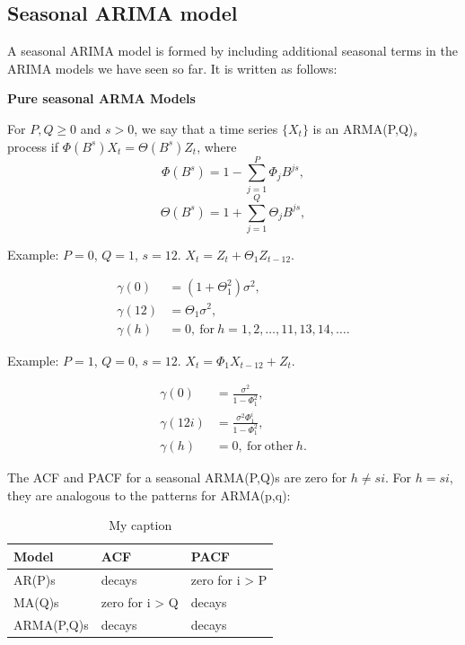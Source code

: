 \documentclass[]{book}
\begin{document}
\subsection{Seasonal ARIMA model}\label{seasonal-arima-model}

A seasonal ARIMA model is formed by including additional seasonal terms
in the ARIMA models we have seen so far. It is written as follows:

\textbf{Pure seasonal ARMA Models}

For \(P,Q \geq 0\) and \(s > 0\), we say that a time series \(\{X_t\}\)
is an ARMA(P,Q)\(_s\) process if \(\Phi(B^s)X_t = \Theta(B^s)Z_t\),
where \[
\Phi(B^s) = 1 - \sum_{j=1}^{P}\Phi_jB^{js},
\] \[
\Theta(B^s) = 1+ \sum_{j=1}^{Q}\Theta_jB^{js},
\]

Example: \(P=0\), \(Q=1\), \(s=12\). \(X_t=Z_t+\Theta_1Z_{t-12}\).

\begin{align*}
\gamma(0) &= (1+\Theta_1^2)\sigma^2,\\
\gamma(12)&= \Theta_1 \sigma^2,\\
\gamma(h) &= 0, \mathrm{~for~} h = 1, 2,\ldots, 11, 13, 14, \ldots.
\end{align*}

Example: \(P=1\), \(Q=0\), \(s=12\). \(X_t=\Phi_1X_{t-12}+Z_{t}\).

\begin{align*}
\gamma(0) &= \frac{\sigma^2}{1-\Phi_1^2},\\
\gamma(12i)&= \frac{\sigma^2\Phi_1^i}{1-\Phi_1^2},\\
\gamma(h) &= 0, \mathrm{~for~other~} h.
\end{align*}

The ACF and PACF for a seasonal ARMA(P,Q)s are zero for \(h \neq si\).
For \(h = si\), they are analogous to the patterns for ARMA(p,q):

\begin{table}[!h]

\caption{\label{tab:unnamed-chunk-159}My caption}
\centering
\begin{tabular}[t]{l|l|l}
\hline
Model & ACF & PACF\\
\hline
AR(P)s & decays & zero for i > P\\
\hline
MA(Q)s & zero for i > Q & decays\\
\hline
ARMA(P,Q)s & decays & decays\\
\hline
\end{tabular}
\end{table}
\end{document}
